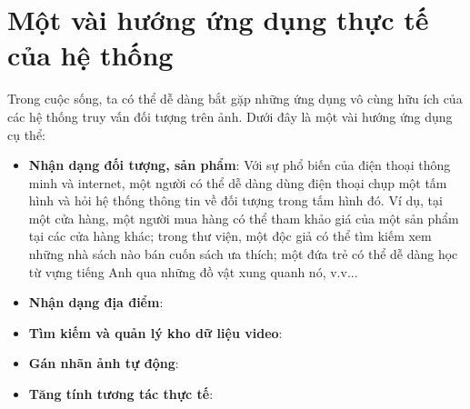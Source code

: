 \section{Một vài hướng ứng dụng thực tế của hệ thống}
Trong cuộc sống, ta có thể dễ dàng bắt gặp những ứng dụng vô cùng hữu ích của các hệ thống truy vấn đối tượng trên ảnh. Dưới đây là một vài hướng ứng dụng cụ thể:\\
\begin{itemize}
  \item \textbf{Nhận dạng đối tượng, sản phẩm}: Với sự phổ biến của điện thoại thông minh và internet, một người có thể dễ dàng dùng điện thoại chụp một tấm hình và hỏi hệ thống thông tin về đối tượng trong tấm hình đó. Ví dụ, tại một cửa hàng, một người mua hàng có thể tham khảo giá của một sản phẩm tại các cửa hàng khác; trong thư viện, một độc giả có thể tìm kiếm xem những nhà sách nào bán cuốn sách ưa thích; một đứa trẻ có thể dễ dàng học từ vựng tiếng Anh qua những đồ vật xung quanh nó, v.v...
  \item \textbf{Nhận dạng địa điểm}: 
  \item \textbf{Tìm kiếm và quản lý kho dữ liệu video}: 
  \item \textbf{Gán nhãn ảnh tự động}:
  \item \textbf{Tăng tính tương tác thực tế}: 
\end{itemize}

%
%

